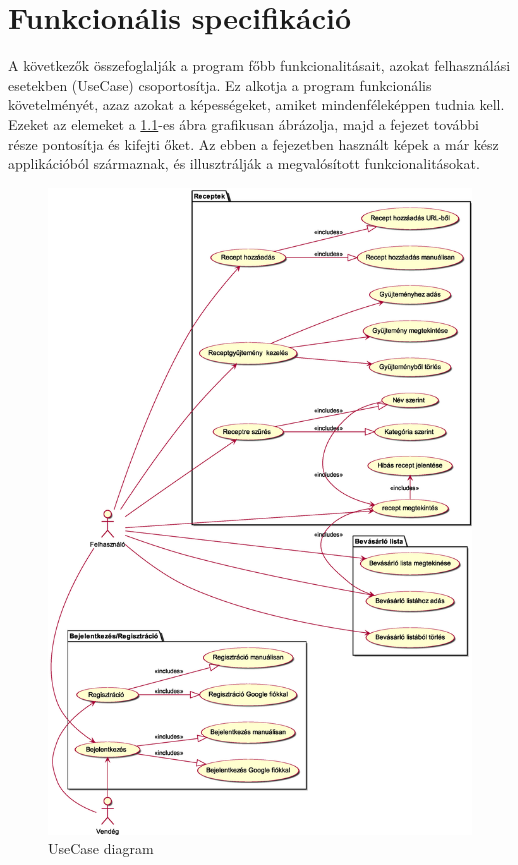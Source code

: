 \documentclass[12pt]{report}
\theoremstyle{definition}
\begin{document}
\chapter{Funkcionális specifikáció}
A következők összefoglalják a program főbb funkcionalitásait, azokat felhasználási esetekben (UseCase) csoportosítja. Ez alkotja a  program funkcionális követelményét, azaz azokat a képességeket, amiket mindenféleképpen tudnia kell. Ezeket az elemeket a \ref{fig:useCase}-es ábra grafikusan ábrázolja, majd a fejezet további része pontosítja és kifejti őket.
Az ebben a fejezetben használt képek a már kész applikációból származnak, és illusztrálják a megvalósított funkcionalitásokat.

\noindent
\begin{figure}[h]
	\centering
	\includegraphics[width=\textwidth]{out/diagrams/useCase/use-case.eps}
	\caption{UseCase diagram}
    \label{fig:useCase}
\end{figure}
\end{document}
